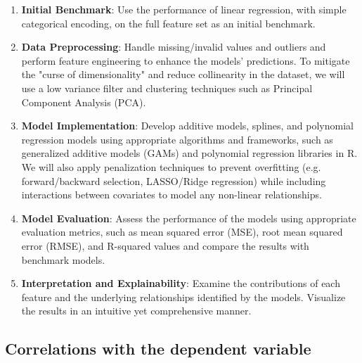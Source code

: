 \documentclass[aoas]{imsart}
\numberwithin{equation}{section}
\theoremstyle{plain}
\theoremstyle{remark}
\begin{document}
\begin{enumerate}
\item
  \textbf{Initial Benchmark}: Use the performance of linear regression, with simple categorical encoding, on the full
  feature set as an initial benchmark.
  \vspace{0.2cm}
\item
  \textbf{Data Preprocessing}: Handle missing/invalid values and outliers and perform feature engineering to enhance
  the models' predictions. To mitigate the "curse of dimensionality" and reduce collinearity in the dataset, we
   will use a low variance filter and clustering techniques such as Principal Component Analysis (PCA).
   \vspace{0.2cm}
\item
  \textbf{Model Implementation}: Develop additive models, splines, and
  polynomial regression models using appropriate algorithms and
  frameworks, such as generalized additive models (GAMs) and polynomial
  regression libraries in R. We will also apply penalization techniques
  to prevent overfitting (e.g. forward/backward selection, LASSO/Ridge regression)
  while including interactions between covariates to model any non-linear relationships.
  \vspace{0.2cm}
\item
  \textbf{Model Evaluation}: Assess the performance of the models using
  appropriate evaluation metrics, such as mean squared error (MSE), root
  mean squared error (RMSE), and R-squared values and compare the
  results with benchmark models.
  \vspace{0.2cm}
\item
  \textbf{Interpretation and Explainability}: Examine the contributions of each
  feature and the underlying relationships identified by the models. Visualize the results in an intuitive yet
  comprehensive manner.
\end{enumerate}

\hypertarget{correlations-with-the-dependent-variable}{%
\subsection{Correlations with the dependent
variable}\label{correlations-with-the-dependent-variable}}
\end{document}
